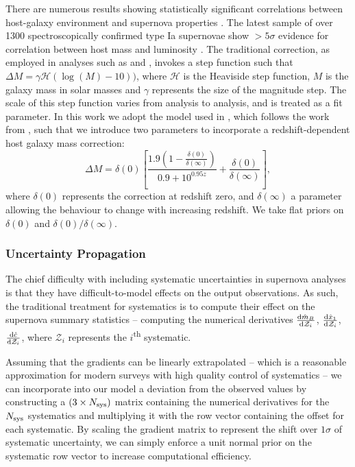 \documentclass[a4paper,fleqn,usenatbib,manuscript]{emulateapj}
\newcommand{\Z}{\mathcal{Z}}
\newcommand{\rubin}{\citetalias{Rubin2015}}
\begin{document}
There are numerous results showing statistically significant correlations between host-galaxy environment and supernova properties \citep{Kelly2010, Lampeitl2010, Sullivan2010, DAndrea2011, Gupta2011, Johansson2013, Rigault2013}. The latest sample of over 1300 spectroscopically confirmed type Ia supernovae show $>5\sigma$ evidence for correlation between host mass and luminosity \citep{Uddin2017}. The traditional correction, as employed in analyses such as \citet{Suzuki2012} and \citet{Betoule2014}, invokes a step function such that $\Delta M = \gamma \mathcal{H}(\log(M) - 10))$, where $\mathcal{H}$ is the Heaviside step function, $M$ is the galaxy mass in solar masses and $\gamma$ represents the size of the magnitude step. The scale of this step function varies from analysis to analysis, and is treated as a fit parameter. In this work we adopt the model used in {\rubin}, which follows the work from \citet{Rigault2013}, such that we introduce two parameters to incorporate a redshift-dependent host galaxy mass correction:
\begin{equation}
\Delta M = \delta(0) \left[ \frac{1.9\left(1 - \frac{\delta(0)}{\delta(\infty)}\right)  }{0.9 + 10^{0.95z}} + \frac{\delta(0)}{\delta(\infty)}\right], \label{eq:mass}
\end{equation}
where $\delta(0)$ represents the correction at redshift zero, and $\delta(\infty)$ a parameter allowing the behaviour to change with increasing redshift. We take flat priors on $\delta(0)$ and $\delta(0)/\delta(\infty)$.



\subsubsection{Uncertainty Propagation}
\label{sec:systreat}
The chief difficulty with including systematic uncertainties in supernova analyses is that they have difficult-to-model effects on the output observations. As such, the traditional treatment for systematics is to compute their effect on the supernova summary statistics -- computing the numerical derivatives $\frac{{\rm d} \hat{m}_B}{{\rm d} \Z_i}$, $\frac{{\rm d} \hat{x}_1}{{\rm d} \Z_i}$, $\frac{{\rm d} \hat{c}}{{\rm d} \Z_i}$, where $\Z_i$ represents the $i$\textsuperscript{th} systematic.

Assuming that the gradients can be linearly extrapolated -- which is a reasonable approximation for modern surveys with high quality control of systematics -- we can incorporate into our model a deviation from the observed values by constructing a $(3 \times N_{\rm sys})$ matrix containing the numerical derivatives for the $N_{\rm sys}$ systematics and multiplying it with the row vector containing the offset for each systematic. By scaling the gradient matrix to represent the shift over $1\sigma$ of systematic uncertainty, we can simply enforce a unit normal prior on the systematic row vector to increase computational efficiency.
\end{document}
